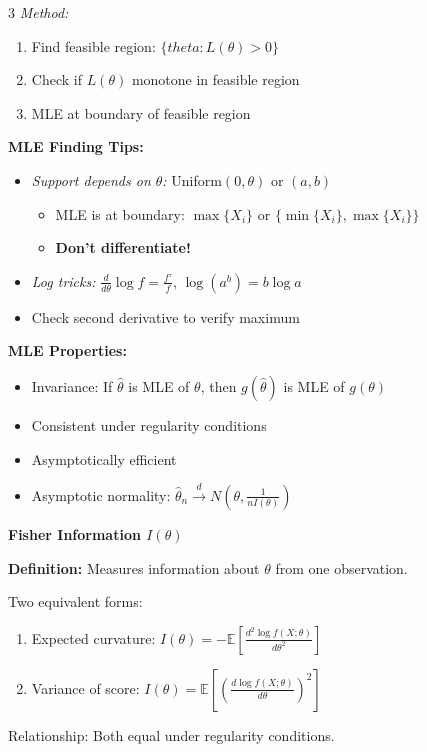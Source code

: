 \documentclass[10pt,letterpaper]{article}
\newcommand{\E}{\mathbb{E}}
\begin{document}
\begin{multicols}{3}
\textit{Method:}
\begin{enumerate}
\item Find feasible region: $\{theta: L(\theta) > 0\}$
\item Check if $L(\theta)$ monotone in feasible region
\item MLE at boundary of feasible region
\end{enumerate}

\textbf{MLE Finding Tips:}
\begin{itemize}
\item \textit{Support depends on $\theta$:} Uniform$(0,\theta)$ or $(a,b)$
  \begin{itemize}
  \item MLE is at boundary: $\max\{X_i\}$ or $\{\min\{X_i\}, \max\{X_i\}\}$
  \item \textbf{Don't differentiate!}
  \end{itemize}
\item \textit{Log tricks:} $\frac{d}{d\theta}\log f = \frac{f'}{f}$, $\log(a^b) = b\log a$
\item Check second derivative to verify maximum
\end{itemize}

\textbf{MLE Properties:}
\begin{itemize}
\item Invariance: If $\hat{\theta}$ is MLE of $\theta$, then $g(\hat{\theta})$ is MLE of $g(\theta)$
\item Consistent under regularity conditions
\item Asymptotically efficient
\item Asymptotic normality: $\hat{\theta}_n \xrightarrow{d} N(\theta, \frac{1}{nI(\theta)})$
\end{itemize}

\textbf{Fisher Information $I(\theta)$}

\textbf{Definition:} Measures information about $\theta$ from one observation.

Two equivalent forms:
\begin{enumerate}
\item Expected curvature: $I(\theta) = -\E\left[\frac{d^2\log f(X;\theta)}{d\theta^2}\right]$
\item Variance of score: $I(\theta) = \E\left[\left(\frac{d\log f(X;\theta)}{d\theta}\right)^2\right]$
\end{enumerate}

Relationship: Both equal under regularity conditions.


\end{multicols}
\end{document}
